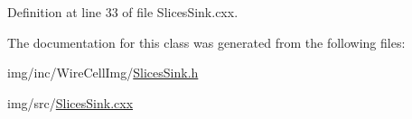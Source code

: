 Definition at line 33 of file Slices\+Sink.\+cxx.



The documentation for this class was generated from the following files\+:\begin{DoxyCompactItemize}
\item 
img/inc/\+Wire\+Cell\+Img/\hyperlink{_slices_sink_8h}{Slices\+Sink.\+h}\item 
img/src/\hyperlink{_slices_sink_8cxx}{Slices\+Sink.\+cxx}\end{DoxyCompactItemize}
